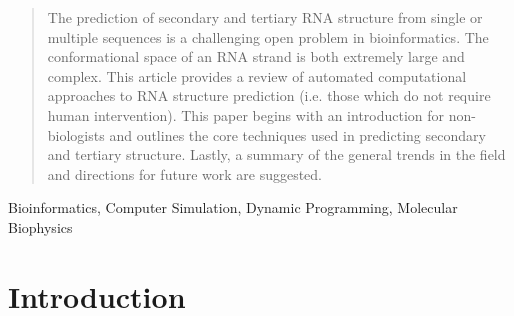 \documentclass[journal]{IEEEtran}
\begin{document}







\maketitle

\begin{abstract}
The prediction of secondary and tertiary RNA structure from single or multiple sequences is a challenging open problem in bioinformatics. The conformational space of an RNA strand is both extremely large and complex. This article provides a review of automated computational approaches to RNA structure prediction (i.e. those which do not require human intervention). This paper begins with an introduction for non-biologists and outlines the core techniques used in predicting secondary and tertiary structure. Lastly, a summary of the general trends in the field and directions for future work are suggested. 
\end{abstract}

\begin{IEEEkeywords}
Bioinformatics, Computer Simulation, Dynamic Programming, Molecular Biophysics
\end{IEEEkeywords}






%
\IEEEpeerreviewmaketitle



\section{Introduction}
\label{sec:intro}
\end{document}
